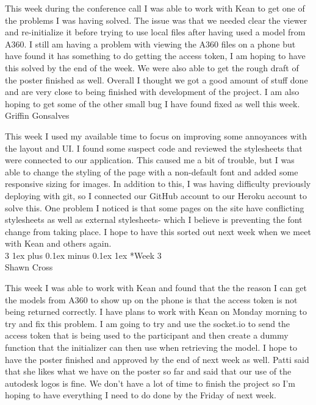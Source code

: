 \documentclass[letterpaper, 10pt, draftclsnofoot, compsoc, onecolumn]{IEEEtran}
\makeatletter
\def\subsubsection{\@startsection{subsubsection}%
                                 {3}%
                                 {\z@}%
                                 {1ex plus 0.1ex minus 0.1ex}%
                                 {1ex}%
                                 {\normalfont\normalsize}}%
\makeatother
\begin{document}
This week during the conference call I was able to work with Kean to get one of the problems I was having solved. The issue was that we needed clear the viewer and re-initialize it before trying to use local files after having used a model from A360. I still am having a problem with viewing the A360 files on a phone but have found it has something to do getting the access token, I am hoping to have this solved by the end of the week. We were also able to get the rough draft of the poster finished as well. Overall I thought we got a good amount of stuff done and are very close to being finished with development of the project. I am also hoping to get some of the other small bug I have found fixed as well this week.\\

Griffin Gonsalves

This week I used my available time to focus on improving some annoyances with the layout and UI. I found some suspect code and reviewed the stylesheets that were connected to our application. This caused me a bit of trouble, but I was able to change the styling of the page with a non-default font and added some responsive sizing for images. In addition to this, I was having difficulty previously deploying with git, so I connected our GitHub account to our Heroku account to solve this. One problem I noticed is that some pages on the site have conflicting stylesheets as well as external stylesheets- which I believe is preventing the font change from taking place. I hope to have this sorted out next week when we meet with Kean and others again.\\

\subsubsection*{Week 3}\hspace*{\fill} \\
Shawn Cross

This week I was able to work with Kean and found that the the reason I can get the models from A360 to show up on the phone is that the access token is not being returned correctly. I have plans to work with Kean on Monday morning to try and fix this problem. I am going to try and use the socket.io to send the access token that is being used to the participant and then create a dummy function that the initializer can then use when retrieving the model. I hope to have the poster finished and approved by the end of next week as well. Patti said that she likes what we have on the poster so far and said that our use of the autodesk logos is fine. We don't have a lot of time to finish the project so I'm hoping to have everything I need to do done by the Friday of next week.\\
\end{document}
